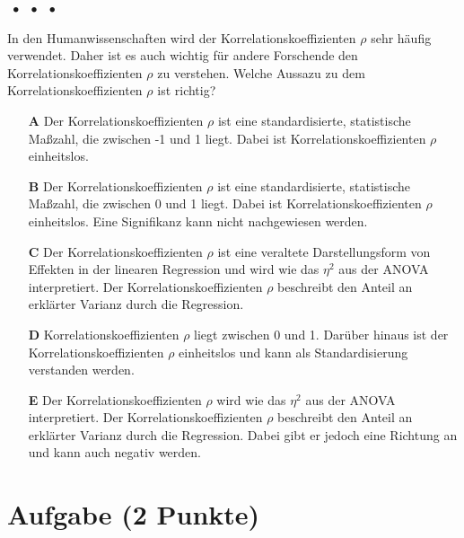 \documentclass[a4paper, 9pt]{scrartcl}\usepackage[]{graphicx}\usepackage[]{xcolor}
\begin{document}
\ifcollection
\begin{flushright}
\tiny\vspace{-2Ex}
\textbf{\examinhaltstart}
\exammodulestat $\;\bullet$
\exammodulestatbbv $\;\bullet$
\exammodulestatversuch $\;\bullet$
\exammodulebiostat
\vspace{-1Ex}
\end{flushright}
\fi




In den Humanwissenschaften wird der Korrelationskoeffizienten $\rho$ sehr häufig verwendet. Daher ist es auch wichtig für andere Forschende den Korrelationskoeffizienten $\rho$ zu verstehen. Welche Aussazu zu dem Korrelationskoeffizienten $\rho$ ist richtig?




\begin{enumerate}
\item [\textbf{A} \msquare] Der Korrelationskoeffizienten $\rho$ ist eine standardisierte, statistische Maßzahl, die zwischen -1 und 1 liegt. Dabei ist Korrelationskoeffizienten $\rho$ einheitslos.
\item [\textbf{B} \msquare] Der Korrelationskoeffizienten $\rho$ ist eine standardisierte, statistische Maßzahl, die zwischen 0 und 1 liegt. Dabei ist Korrelationskoeffizienten $\rho$ einheitslos. Eine Signifikanz kann nicht nachgewiesen werden.
\item [\textbf{C} \msquare] Der Korrelationskoeffizienten $\rho$ ist eine veraltete Darstellungsform von Effekten in der linearen Regression und wird wie das $\eta^2$ aus der ANOVA interpretiert. Der Korrelationskoeffizienten $\rho$ beschreibt den Anteil an erklärter Varianz durch die Regression.
\item [\textbf{D} \msquare] Korrelationskoeffizienten $\rho$ liegt zwischen 0 und 1. Darüber hinaus ist der Korrelationskoeffizienten $\rho$ einheitslos und kann als Standardisierung verstanden werden.
\item [\textbf{E} \msquare] Der Korrelationskoeffizienten $\rho$ wird wie das $\eta^2$ aus der ANOVA interpretiert. Der Korrelationskoeffizienten $\rho$ beschreibt den Anteil an erklärter Varianz durch die Regression. Dabei gibt er jedoch eine Richtung an und kann auch negativ werden.
\end{enumerate}

\section{Aufgabe \hfill (2 Punkte)}
\end{document}
